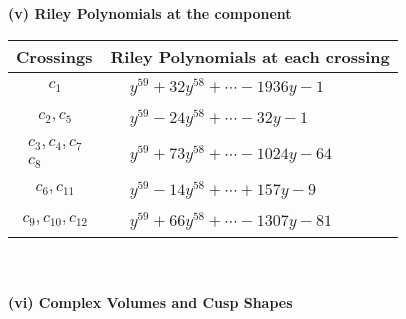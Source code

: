 \documentclass[1p]{elsarticle_modified}
\theoremstyle{definition}
\begin{document}
\newpage\renewcommand{\arraystretch}{1}
\flushleft \textbf{(v) Riley Polynomials at the component}\newline \\
\begin{tabular}{m{50pt}|m{274pt}}
Crossings & \hspace{64pt}Riley Polynomials at each crossing \\
\hline $$\begin{aligned}c_{1}\end{aligned}$$&$\begin{aligned}
&y^{59}+32 y^{58}+\cdots-1936 y-1
\end{aligned}$\\
\hline $$\begin{aligned}c_{2},c_{5}\end{aligned}$$&$\begin{aligned}
&y^{59}-24 y^{58}+\cdots-32 y-1
\end{aligned}$\\
\hline $$\begin{aligned}c_{3},c_{4},c_{7}\\c_{8}\end{aligned}$$&$\begin{aligned}
&y^{59}+73 y^{58}+\cdots-1024 y-64
\end{aligned}$\\
\hline $$\begin{aligned}c_{6},c_{11}\end{aligned}$$&$\begin{aligned}
&y^{59}-14 y^{58}+\cdots+157 y-9
\end{aligned}$\\
\hline $$\begin{aligned}c_{9},c_{10},c_{12}\end{aligned}$$&$\begin{aligned}
&y^{59}+66 y^{58}+\cdots-1307 y-81
\end{aligned}$\\
\hline
\end{tabular}\\~\\
\newpage\flushleft \textbf{(vi) Complex Volumes and Cusp Shapes}
\end{document}
